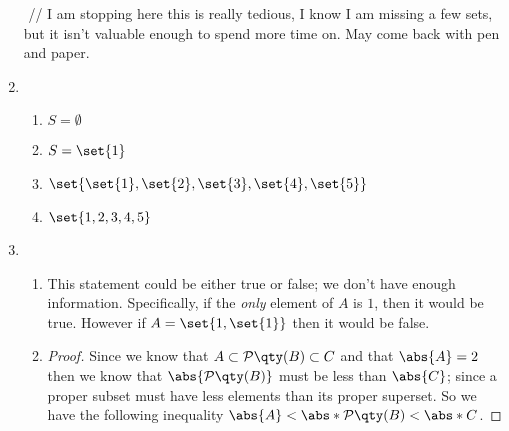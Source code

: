 \documentclass[12pt]{article}
\begin{document}
\begin{enumerate}[label=1.\arabic*]
\begin{math}
    \end{math}
    // I am stopping here this is really tedious, I know I am missing a few sets, but it isn't
    valuable enough to spend more time on. May come back with pen and paper.
    \item
      \begin{enumerate}[label=(\alph*)]
        \item $S=\emptyset$
        \item $S=\set{1}$
        \item $\set{\set{1},\set{2},\set{3},\set{4},\set{5}}$
        \item $\set{1,2,3,4,5}$
      \end{enumerate}
    \item
      \begin{enumerate}[label=(\alph*)]
        \item This statement could be either true or false; we don't have enough
              information. Specifically, if the \emph{only} element of $A$ is $1$, then
              it would be true. However if $A=\set{1, \set{1}}$ then it would be false.
        \item
              \begin{proof}
              Since we know that $A \subset \mathcal{P}\qty(B) \subset C$ and that
              $\abs{A}=2$ then we know that $\abs{\mathcal{P}\qty(B)}$ must be
              less than $\abs{C}$; since a proper subset must have less elements than its proper
              superset. So we have the following inequality $\abs{A} < \abs*{\mathcal{P}\qty(B)} < \abs*{C}$. 


\end{proof}
\end{enumerate}
\end{enumerate}
\end{document}
